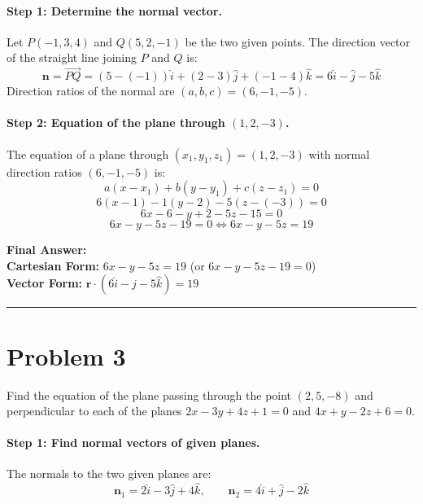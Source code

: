 \documentclass[11pt,a4paper]{article}
\begin{document}
\paragraph{Step 1: Determine the normal vector.}
Let $P(-1, 3, 4)$ and $Q(5, 2, -1)$ be the two given points. The direction vector of the straight line joining $P$ and $Q$ is:
$$\mathbf{n} = \vec{PQ} = (5 - (-1))\hat{i} + (2 - 3)\hat{j} + (-1 - 4)\hat{k} = 6\hat{i} - \hat{j} - 5\hat{k}$$
Direction ratios of the normal are $(a, b, c) = (6, -1, -5)$.

\paragraph{Step 2: Equation of the plane through $(1, 2, -3)$.}
The equation of a plane through $(x_1, y_1, z_1) = (1, 2, -3)$ with normal direction ratios $(6, -1, -5)$ is:
$$a(x - x_1) + b(y - y_1) + c(z - z_1) = 0$$
$$6(x - 1) - 1(y - 2) - 5(z - (-3)) = 0$$
$$6x - 6 - y + 2 - 5z - 15 = 0$$
$$6x - y - 5z - 19 = 0 \iff 6x - y - 5z = 19$$

\begin{resultbox}
\textbf{Final Answer:}\\
\textbf{Cartesian Form:} $\boxed{6x - y - 5z = 19}$ \quad (or $6x - y - 5z - 19 = 0$)\\
\textbf{Vector Form:} $\boxed{\mathbf{r} \cdot (6\hat{i} - \hat{j} - 5\hat{k}) = 19}$
\end{resultbox}

\vspace{0.4cm}
\hrule
\vspace{0.4cm}

\section{Problem 3}
\begin{problembox}[Problem 3]
Find the equation of the plane passing through the point $(2, 5, -8)$ and perpendicular to each of the planes $2x - 3y + 4z + 1 = 0$ and $4x + y - 2z + 6 = 0$.
\end{problembox}

\paragraph{Step 1: Find normal vectors of given planes.}
The normals to the two given planes are:
$$\mathbf{n}_1 = 2\hat{i} - 3\hat{j} + 4\hat{k}, \qquad \mathbf{n}_2 = 4\hat{i} + \hat{j} - 2\hat{k}$$
\end{document}
